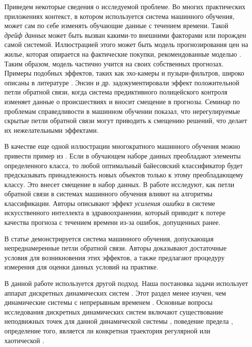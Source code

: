 Приведем некоторые сведения о исследуемой проблеме. Во многих практических приложениях контекст, в котором используется система машинного обучения, может сам по себе изменять обучающие данные с течением времени. Такой \emph{дрейф данных} может быть вызван какими-то внешними факторами или порожден самой системой. Иллюстрацией этого может быть модель прогнозирования цен на жилье, которая опирается на фактические покупки, рекомендованные моделью \cite{khritankov2021hidden}. Таким образом, модель частично учится на своих собственных прогнозах. Примеры подобных эффектов, таких как эхо-камеры и пузыри-фильтров, широко описаны в литературе \cite{davies2018redefining, spohr2017fake, michiels2022filter, khritankov2021existence}. Энсин и др. \cite{ensign2018runaway} задокументировали эффект положительной петли обратной связи, когда система предиктивного полицейского контроля изменяет данные о происшествиях и вносит смещение в прогнозы. Семинар по проблемам справедливости в машинном обучении \cite{chouldechova2020snapshot} показал, что нерегулируемые скрытые петли обратной связи могут приводить к смещению решений, что делает их нежелательными эффектами.

В качестве еще одной иллюстрации многократного машинного обучения можно привести пример из \cite{taori2023data}. Если в обучающем наборе данных преобладают элементы определенного класса, то любой оптимальный байесовский классификатор будет предсказывать принадлежность новых объектов только к этому преобладающему классу. Это внесет смещение в набор данных. В работе \cite{adam2022error} исследуют, как петли обратной связи в системах машинного обучения влияют на алгоритмы классификации. Авторы описывают эффект \textit{усиления ошибки} в системе искусственного интеллекта в здравоохранении, который приводит к потере качества прогноза с течением времени из-за ошибок, допущенных ранее.

В статье \cite{khritankov2023positive} демонстрируется система машинного обучения, допускающая непреднамеренные петли обратной связи. Авторы доказывают достаточные условия для возникновения этих эффектов, а также предлагают процедуру измерения для оценки данных условий на практике.

В данной работе используется другой подход. Наша постановка задачи использует аппарат дискретных динамических систем \cite{galor2007discrete, sandefur1990discrete}. Этот раздел менее изучен, чем динамические системы с непрерывным временем \cite{katok1995introduction, nemytskii2015qualitative, pauline2022observer, ouannas2017simple}. Основные вопросы исследования дискретных динамических систем включают существование неподвижных точек для данной динамической системы \cite{milnor2018analytic}, поведение предела \cite{sharma2015uniform}, определение того, является ли конкретная траектория регулярной или хаотической \cite{zhang2006discrete}. 

